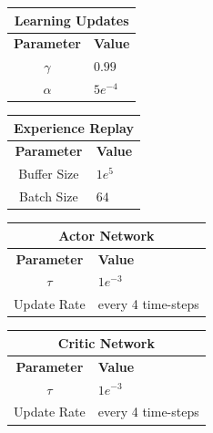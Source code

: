 \documentclass[12pt]{article}
\begin{document}
\begin{table}[h!t]
\begin{minipage}{.5\linewidth}
\begin{tabular}{|c|l|}
	\hline
	\multicolumn{2}{|c|}{\textbf{Learning Updates}}\\
	\hline
	\hline
	\textbf{Parameter} & \textbf{Value}\\
	\hline
	$\gamma$ & $0.99$\\
	$\alpha$ & $5e^{-4}$\\
	\hline
\end{tabular}
\end{minipage}
\begin{minipage}{.5\linewidth}
\begin{tabular}{|c|l|}
	\hline
	\multicolumn{2}{|c|}{\textbf{Experience Replay}}\\
	\hline
	\hline
	\textbf{Parameter} & \textbf{Value}\\
	\hline
	Buffer Size & $1e^{5}$\\
	Batch Size & $64$\\
	\hline
\end{tabular}
\end{minipage}
\end{table}
\begin{table}
\begin{minipage}{.5\linewidth}
\begin{tabular}{|c|l|}
	\hline
	\multicolumn{2}{|c|}{\textbf{Actor Network}}\\
	\hline
	\hline
	\textbf{Parameter} & \textbf{Value}\\
	\hline
		$\tau$ & $1e^{-3}$\\
		Update Rate & every 4 time-steps \\
	\hline
\end{tabular}
\end{minipage}
\begin{minipage}{.5\linewidth}
\begin{tabular}{|c|l|}
	\hline
	\multicolumn{2}{|c|}{\textbf{Critic Network}}\\
	\hline
	\hline
	\textbf{Parameter} & \textbf{Value}\\
	\hline
		$\tau$ & $1e^{-3}$\\
		Update Rate & every 4 time-steps \\
	\hline
\end{tabular}
\end{minipage}
\end{table}
\end{document}
